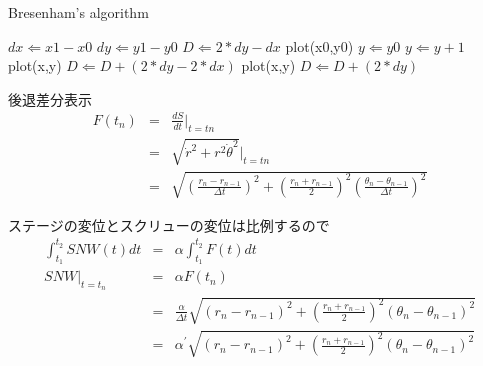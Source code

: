 \documentclass{article}
\begin{document}
\begin{algorithm}                      
\caption{Bresenham's algorithm}
\label{alg1}                          
\begin{algorithmic}                  
\STATE $dx \Leftarrow x1-x0$
\STATE $dy \Leftarrow y1-y0$
\STATE $D \Leftarrow 2*dy - dx$
\STATE plot(x0,y0)
\STATE $y \Leftarrow y0$
\STATE      $y \Leftarrow y+1$
\STATE      plot(x,y)
\STATE      $D \Leftarrow D + (2*dy-2*dx)$
\ELSE
\STATE      plot(x,y)
\STATE      $D \Leftarrow D + (2*dy)$
\ENDIF
\ENDFOR
\end{algorithmic}
\end{algorithm}



後退差分表示
\begin{eqnarray*}
F(t_n) &=& \frac{d S}{d t}\Bigg|_{t=tn} \\
&=& \sqrt{\dot{r}^2+r^2 \dot{\theta}^2}\Big|_{t=tn} \\
&=& \sqrt{\left( \frac{r_n - r_{n-1}}{\Delta t} \right)^2 + \left(\frac{r_n+r_{n-1}}{2} \right)^2 \left( \frac{\theta_n - \theta_{n-1} }{\Delta t} \right)^2}	
\end{eqnarray*}

ステージの変位とスクリューの変位は比例するので
\begin{eqnarray*}
\int_{t_1}^{t_2} SNW(t)dt &=& \alpha \int_{t_1}^{t_2} F(t) dt \\
SNW\big|_{t=t_n} &=& \alpha F(t_n)  \\
&=& \frac{\alpha}{\Delta t} \sqrt{\left( r_n - r_{n-1} \right)^2 + \left(\frac{r_n+r_{n-1}}{2} \right)^2 \left( \theta_n - \theta_{n-1} \right)^2} \\
&=& \alpha^\prime \sqrt{\left( r_n - r_{n-1} \right)^2 + \left(\frac{r_n+r_{n-1}}{2} \right)^2  \left( \theta_n - \theta_{n-1} \right)^2}
\end{eqnarray*}
\end{document}
